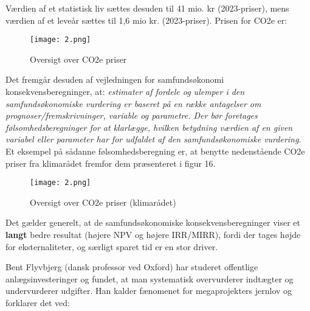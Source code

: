 \documentclass[10pt,reqno, usenames]{article}
\begin{document}
Værdien af et statistisk liv sættes desuden til 41 mio. kr (2023-priser), mens værdien af et leveår sættes til 1,6 mio kr. (2023-priser). Prisen for CO2e er: 

\begin{figure}[h]
     \centering
     \texttt{[image: 2.png]}
     \caption{Oversigt over CO2e priser}
     \label{Figur 2}
\end{figure} 

Det fremgår desuden af vejledningen for samfundsøkonomi konsekvensberegninger, at: \textit{estimater af fordele og ulemper i den
samfundsøkonomiske vurdering er baseret på en række antagelser om prognoser/fremskrivninger, variable og parametre. Der bør foretages
følsomhedsberegninger for at klarlægge, hvilken betydning værdien af en given variabel eller parameter har for udfaldet af den samfundsøkonomiske vurdering}. Et eksempel på sådanne følsomhedsberegning er, at benytte nedenstående CO2e priser fra klimarådet fremfor dem præsenteret i figur 16. 

\begin{figure}[h]
     \centering
     \texttt{[image: 2.png]}
     \caption{Oversigt over CO2e priser (klimarådet)}
     \label{Figur 2}
\end{figure} 

Det gælder generelt, at de samfundsøkonomiske konsekvensberegninger viser et \textbf{langt} bedre resultat (højere NPV og højere IRR/MIRR), fordi der tages højde for eksternaliteter, og særligt sparet tid er en stor driver. 

\vspace{10 pt}

Bent Flyvbjerg (dansk professor ved Oxford) har studeret offentlige anlægsinvesteringer og fundet, at man systematisk overvurderer indtægter og undervurderer udgifter. Han kalder fænomenet for megaprojekters jernlov og forklarer det ved: 
\end{document}
